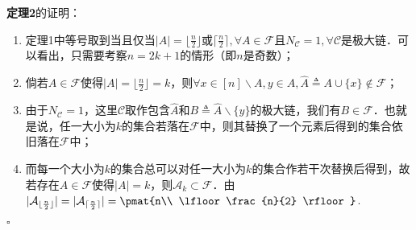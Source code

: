 \textbf{定理2}的证明：
\begin{enumerate}
\item 定理1中等号取到当且仅当$|A|=\lfloor\frac{n}{2} \rfloor$或$\lceil\frac{n}{2} \rceil,\forall A\in \mathcal{F}$且$N_{\mathcal{C}}=1,\forall \mathcal{C}$是极大链．可以看出，只需要考察$n=2k+1$的情形（即$n$是奇数）；
\item 倘若$A\in \mathcal{F}$使得$|A|=\lfloor\frac{n}{2} \rfloor=k$，则$\forall x\in [n]\backslash A,y\in A,\hat{A}\triangleq A\cup\{x\}\notin \mathcal{F}$；
\item 由于$N_{\mathcal{C}}=1$，这里$\mathcal{C}$取作包含$\hat{A}$和$B\triangleq \hat{A}\backslash\{y\}$的极大链，我们有$B\in \mathcal{F}$．也就是说，任一大小为$k$的集合若落在$\mathcal{F}$中，则其替换了一个元素后得到的集合依旧落在$\mathcal{F}$中；
\item 而每一个大小为$k$的集合总可以对任一大小为$k$的集合作若干次替换后得到，故若存在$A\in \mathcal{F}$使得$|A|=k$，则$\mathcal{A}_k\subset \mathcal{F}$．由$|\mathcal{A}_{\lfloor\frac{n}{2} \rfloor}|=| \mathcal{A}_{\lceil\frac{n}{2} \rceil}|=\pmat{n\\ \lfloor\frac{n}{2} \rfloor}$.
\end{enumerate}

$\square$


